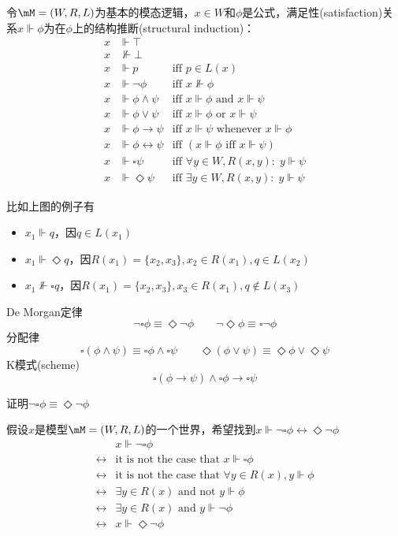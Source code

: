 \begin{definition}
令$\mM=(W,R,L)$为基本的模态逻辑，$x\in W$和$\phi$是公式，满足性(satisfaction)关系$x\Vdash\phi$为在$\phi$上的结构推断(structural induction)：
\[\begin{array}{rll}
x & \Vdash\top\\
x & \not\Vdash\bot\\
x & \Vdash p & \text{iff } p\in L(x)\\
x & \Vdash\lnot\phi & \text{iff } x\not\Vdash\phi\\
x & \Vdash\phi\land\psi & \text{iff } x\Vdash\phi \text{ and } x\Vdash\psi\\
x & \Vdash\phi\lor\psi & \text{iff } x\Vdash\phi \text{ or } x\Vdash\psi\\
x & \Vdash\phi\to\psi & \text{iff } x\Vdash\psi \text{ whenever } x\Vdash\phi\\
x & \Vdash\phi\leftrightarrow\psi & \text{iff } (x\Vdash\phi \text{ iff } x\Vdash\psi)\\
x & \Vdash\square\psi & \text{iff }\forall y\in W, R(x,y):\; y\Vdash\psi\\
x & \Vdash\Diamond\psi & \text{iff }\exists y\in W, R(x,y):\; y\Vdash\psi
\end{array}\]
\end{definition}
\begin{example}
比如上图的例子有
\begin{itemize}
	\item $x_1\Vdash q$，因$q\in L(x_1)$
	\item $x_1\Vdash\Diamond q$，因$R(x_1)=\{x_2,x_3\},x_2\in R(x_1),q\in L(x_2)$
	\item $x_1\not\Vdash\square q$，因$R(x_1)=\{x_2,x_3\},x_3\in R(x_1),q\notin L(x_3)$
\end{itemize}
\end{example}

De Morgan定律
\[\lnot\square\phi\equiv\Diamond\lnot\phi\qquad
\lnot\Diamond\phi\equiv\square\lnot\phi\]
分配律
\[\square(\phi\land\psi)\equiv\square\phi\land\square\psi\qquad
\Diamond(\phi\lor\psi)\equiv\Diamond\phi\lor\Diamond\psi\]
K模式(scheme)
\[\square(\phi\to\psi)\land\square\phi\to\square\psi\]
\begin{example}
证明$\lnot\square\phi\equiv\Diamond\lnot\phi$
\end{example}
\begin{analysis}
假设$x$是模型$\mM=(W,R,L)$的一个世界，希望找到$x\Vdash\lnot\square\phi\leftrightarrow\Diamond\lnot\phi$
\[\begin{aligned}
& x\Vdash\lnot\square\phi\\
\leftrightarrow & \text{it is not the case that } x\Vdash\square\phi\\
\leftrightarrow & \text{it is not the case that } \forall y\in R(x), y\Vdash\phi\\
\leftrightarrow & \exists y\in R(x)\text{ and not }y\Vdash\phi\\
\leftrightarrow & \exists y\in R(x)\text{ and }y\Vdash\lnot\phi\\
\leftrightarrow & x\Vdash\Diamond\lnot\phi
\end{aligned}\]
\end{analysis}